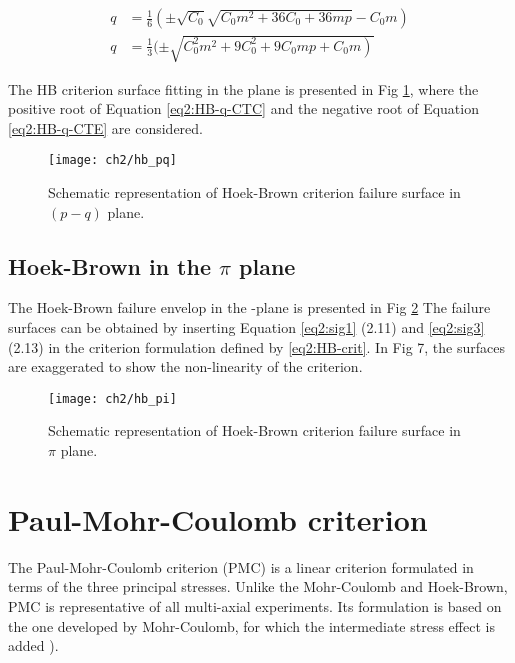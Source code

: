 \begin{align}
    q&=\frac{1}{6}\left(\pm \sqrt{C_{0}} \sqrt{C_{0} m^{2}+36 C_{0}+36 m p}-C_{0} m\right) \label{eq2:HB-q-CTC} \\
    q&=\frac{1}{3}(\pm \sqrt{\left.C_{0}^{2} m^{2}+9 C_{0}^{2}+9 C_{0} m p+C_{0} m\right)} \label{eq2:HB-q-CTE}
\end{align}

The HB criterion surface fitting in the  plane is presented in Fig \ref{fig2:hb_pq}, where the positive root of Equation \ref{eq2:HB-q-CTC} and the negative root of Equation \ref{eq2:HB-q-CTE} are considered.

\begin{figure}[tb]
    \centering
    \texttt{[image: ch2/hb\_pq]}
    \caption{Schematic representation of Hoek-Brown criterion failure surface in $(p-q)$ plane.}
    \label{fig2:hb_pq}
\end{figure} 

\subsection{Hoek-Brown in the \texorpdfstring{$\pi$}{pi} plane}\label{ch2:HB_pi}

The Hoek-Brown failure envelop in the -plane is presented in Fig \ref{fig2:hb_pi} The failure surfaces can be obtained by inserting Equation \ref{eq2:sig1} (2.11) and \ref{eq2:sig3}  (2.13) in the criterion formulation defined by \ref{eq2:HB-crit}. In Fig 7, the surfaces are exaggerated to show the non-linearity of the criterion.  

\begin{figure}[tb]
    \centering
    \texttt{[image: ch2/hb\_pi]}
    \caption{Schematic representation of Hoek-Brown criterion failure surface in $\pi$ plane.}
    \label{fig2:hb_pi}
\end{figure} 

\section{Paul-Mohr-Coulomb criterion}

The Paul-Mohr-Coulomb criterion (PMC) is a linear criterion formulated in terms of the three principal stresses. Unlike the Mohr-Coulomb and Hoek-Brown, PMC is representative of all multi-axial experiments. Its formulation is based on the one developed by Mohr-Coulomb, for which the intermediate stress effect is added \cite[Paul (1968)]{Paul1968}). 

